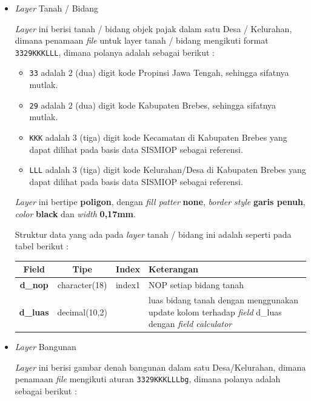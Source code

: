 \begin{itemize}

  \item \textit{Layer} Tanah / Bidang
  
  \textit{Layer} ini berisi tanah / bidang objek pajak dalam satu Desa / Kelurahan, dimana penamaan \textit{file} untuk layer tanah / bidang mengikuti format \texttt{3329KKKLLL}, dimana polanya adalah sebagai berikut :
  
  \begin{itemize}
    \item \texttt{33} adalah 2 (dua) digit kode Propinsi Jawa Tengah, sehingga sifatnya mutlak.
    \item \texttt{29} adalah 2 (dua) digit kode Kabupaten Brebes, sehingga sifatnya mutlak.
    \item \texttt{KKK} adalah 3 (tiga) digit kode Kecamatan di Kabupaten Brebes yang dapat dilihat pada basis data SISMIOP sebagai referensi.
    \item \texttt{LLL} adalah 3 (tiga) digit kode Kelurahan/Desa di Kabupaten Brebes yang dapat dilihat pada basis data SISMIOP sebagai referensi.
  \end{itemize}
  
  \textit{Layer} ini bertipe \textbf{poligon}, dengan \textit{fill patter} \textbf{none}, \textit{border style} \textbf{garis penuh}, \textit{color} \textbf{black} dan \textit{width} \textbf{0,17mm}. 
  
  Struktur data yang ada pada \textit{layer} tanah / bidang ini adalah seperti pada tabel berikut :
  
  \begin{table}[H]
    \centering
    \begin{tabular}{| c | c | c | p{7cm} |}
      \hline
      Field & Tipe & Index & Keterangan \\
      \hline \hline
      \textbf{d\_nop} & character(18) & index1 & NOP setiap bidang tanah \\
      \hline
      \textbf{d\_luas} & decimal(10,2) & & luas bidang tanah dengan menggunakan update kolom terhadap \textit{field} d\_luas dengan \textit{field calculator} \\
      \hline
    \end{tabular}
  \end{table}
  
  \item \textit{Layer} Bangunan
  
  \textit{Layer} ini berisi gambar denah bangunan dalam satu Desa/Kelurahan, dimana penamaan \textit{file} mengikuti aturan \texttt{3329KKKLLLbg}, dimana polanya adalah sebagai berikut :
  

\end{itemize}

